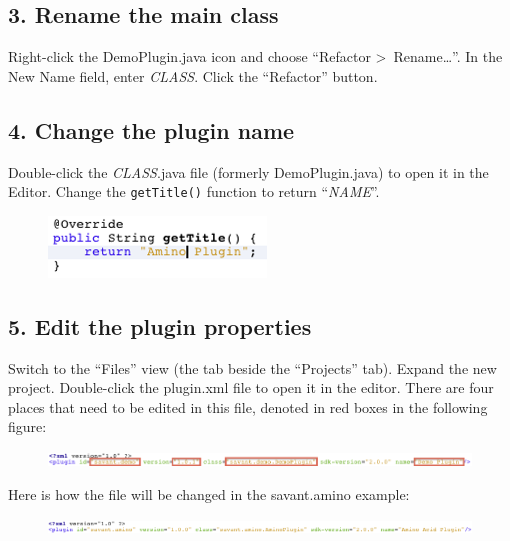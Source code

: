 \documentclass[times,11pt]{report}
\begin{document}
\subsection*{3. Rename the main class}
Right-click the DemoPlugin.java icon and choose ``Refactor \textgreater~Rename\ldots''. In the New Name field, enter \textit{CLASS}. Click the ``Refactor'' button.

\subsection*{4. Change the plugin name}
Double-click the \textit{CLASS}.java file (formerly DemoPlugin.java) to open it in the Editor. Change the {\tt getTitle()} function to return ``\textit{NAME}''.
\begin{figure}[h!]
\begin{center}
\includegraphics[type=png,ext=.png,read=.png]{images/RenamePlugin}
\end{center}
\end{figure}

\subsection*{5. Edit the plugin properties}
Switch to the ``Files'' view (the tab beside the ``Projects'' tab). Expand the new project. Double-click the plugin.xml  file to open it in the editor. There are four places that need to be edited in this file, denoted in red boxes in the following figure:
\begin{figure}[h!]
\begin{center}
\includegraphics[type=png,ext=.png,read=.png,width=16cm]{images/PluginXML}
\end{center}
\end{figure}

Here is how the file will be changed in the savant.amino example:
\begin{figure}[h!]
\begin{center}
\includegraphics[type=png,ext=.png,read=.png,width=16cm]{images/PluginXML2}
\end{center}
\end{figure}
\end{document}
